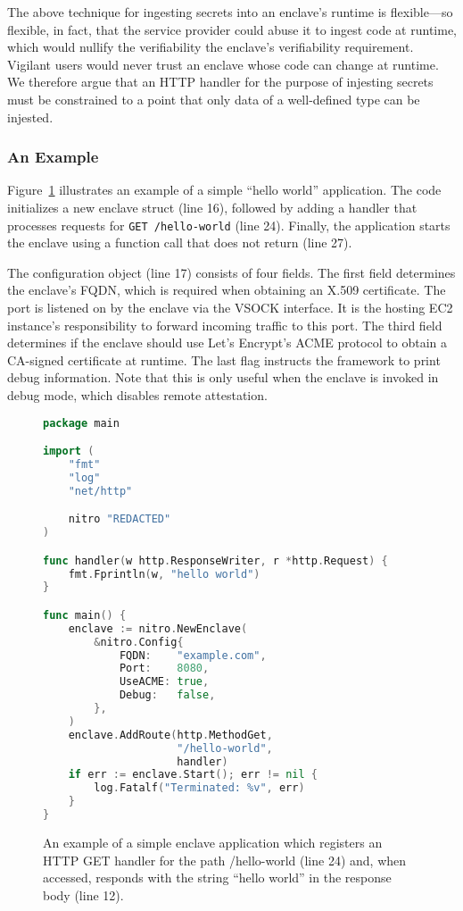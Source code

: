 The above technique for ingesting secrets into an enclave's runtime is
flexible---so flexible, in fact, that the service provider could abuse it to
ingest code at runtime, which would nullify the verifiability the enclave's
verifiability requirement.  Vigilant users would never trust an enclave whose
code can change at runtime.  We therefore argue that an HTTP handler for the
purpose of injesting secrets must be constrained to a point that only data of a
well-defined type can be injested.

\subsubsection{An Example}
\label{sec:example}

Figure~\ref{fig:hello-world} illustrates an example of a simple ``hello world''
application.  The code initializes a new enclave struct (line 16), followed by
adding a handler that processes requests for \texttt{GET /hello-world} (line
24).  Finally, the application starts the enclave using a function call that
does not return (line 27).

The configuration object (line 17) consists of four fields.  The first field
determines the enclave's FQDN, which is required when obtaining an X.509
certificate.  The port is listened on by the enclave via the VSOCK interface.
It is the hosting EC2 instance's responsibility to forward incoming traffic to
this port.  The third field determines if the enclave should use Let's Encrypt's
ACME protocol to obtain a CA-signed certificate at runtime.
The last flag instructs the framework to print debug information.  Note that
this is only useful when the enclave is invoked in debug mode, which disables
remote attestation.

\begin{figure}[t]
\begin{lstlisting}[language=go]
package main

import (
    "fmt"
    "log"
    "net/http"

    nitro "REDACTED"
)

func handler(w http.ResponseWriter, r *http.Request) {
    fmt.Fprintln(w, "hello world")
}

func main() {
    enclave := nitro.NewEnclave(
        &nitro.Config{
            FQDN:    "example.com",
            Port:    8080,
            UseACME: true,
            Debug:   false,
        },
    )
    enclave.AddRoute(http.MethodGet,
                     "/hello-world",
                     handler)
    if err := enclave.Start(); err != nil {
        log.Fatalf("Terminated: %v", err)
    }
}
\end{lstlisting}
\caption{An example of a simple enclave application which registers an HTTP GET
  handler for the path /hello-world (line 24) and, when accessed, responds with
  the string ``hello world'' in the response body (line 12).}
\label{fig:hello-world}
\end{figure}
